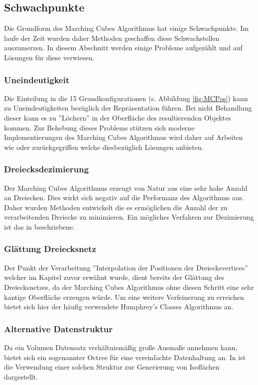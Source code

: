 \subsection{Schwachpunkte}
\label{sec:schwach}
Die Grundform des Marching Cubes Algorithmus hat einige Schwachpunkte. Im laufe der Zeit wurden daher Methoden geschaffen diese Schwachstellen auszumerzen. In diesem Abschnitt werden einige Probleme aufgezählt und auf Lösungen für diese verwiesen.

\subsubsection{Uneindeutigkeit}
Die Einteilung in die 15 Grundkonfigurationen (s. Abbildung \ref{fig:MCPos}) kann zu Uneindeutigkeiten bezüglich der Repräsentation führen. Bei nicht Behandlung dieser kann es zu ''Löchern'' in der Oberfläche des resultierenden Objektes kommen. Zur Behebung dieses Problems stützen sich moderne Implementierungen des Marching Cubes Algorithmus wird daher auf Arbeiten wie \citep{Leak1} oder \citep{Leak2} zurückgegriffen welche diesbezüglich Lösungen anbieten.
\subsubsection{Dreiecksdezimierung}
Der Marching Cubes Algorithmus erzeugt von Natur aus eine sehr hohe Anzahl an Dreiecken. Dies wirkt sich negativ auf die Performanz des Algorithmus aus. Daher wurden Methoden entwickelt die es ermöglichen die Anzahl der zu verarbeitenden Dreiecke zu minimieren. Ein mögliches Verfahren zur Dezimierung ist das in \citep{DecTri} beschriebene.
\subsubsection{Glättung Dreiecksnetz}
Der Punkt der Verarbeitung ''Interpolation der Positionen der Dreiecksvertices'' welcher im Kapitel zuvor erwähnt wurde, dient bereits der Glättung des Dreiecksnetzes, da der Marching Cubes Algorithmus ohne diesen Schritt eine sehr kantige Oberfläche erzeugen würde. Um eine weitere Verfeinerung zu erreichen bietet sich hier der häufig verwendete Humphrey’s Classes Algorithmus \citep{Verf} an.
\subsubsection{Alternative Datenstruktur}
Da ein Volumen Datensatz verhältnismäßig große Ausmaße annehmen kann, bietet sich ein sogenannter Octree für eine vereinfachte Datenhaltung an. In \citep{Octree} ist die Verwendung einer solchen Struktur zur Generierung von Isoflächen dargestellt.

